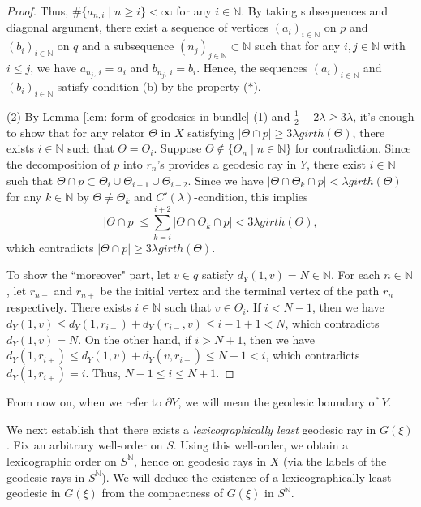 \documentclass{article}[11pt]
\newcommand{\N}{\mathbb{N}}
\begin{document}
{\begin{proof}
{    Thus, $\#\{a_{n,i} \mid n \ge i \} < \infty$ for any $i \in \N$. By taking subsequences and diagonal argument, there exist a sequence of vertices $(a_i)_{i \in \N}$ on $p$ and $(b_i)_{i \in \N}$ on $q$ and a subsequence $(n_j)_{j \in \N} \subset \N$ such that for any $i,j \in \N$ with $i \le j$, we have $a_{n_j,\,i} = a_i$ and $b_{n_j,\,i} = b_i$. Hence, the sequences $(a_i)_{i \in \N}$ and $(b_i)_{i \in \N}$ satisfy condition (b) by the property ($\ast$).

    (2)
    By Lemma \ref{lem: form of geodesics in bundle} (1) and $\frac12 - 2\lambda\ge 3\lambda$, it's enough to show that for any relator $\Theta$ in $X$ satisfying $|\Theta \cap p| \ge 3 \lambda girth(\Theta)$, there exists $i \in \N$ such that $\Theta = \Theta_i$. Suppose $\Theta \notin \{\Theta_n \mid n \in \N\}$ for contradiction. Since the decomposition of $p$ into $r_n$'s provides a geodesic ray in $Y$, there exist $i \in \N$ such that $\Theta \cap p \subset \Theta_i\cup\Theta_{i+1}\cup\Theta_{i+2}$. Since we have $|\Theta \cap\Theta_k \cap p| < \lambda girth(\Theta)$ for any $k\in \N$ by $\Theta \neq\Theta_k$ and $C'(\lambda)$-condition, this implies 
    $$|\Theta \cap p| \le \sum_{k=i}^{i+2}|\Theta \cap\Theta_k \cap p| < 3\lambda girth(\Theta),$$
    which contradicts $|\Theta \cap p| \ge 3 \lambda girth(\Theta)$.

    To show the ``moreover" part, let $v \in q$ satisfy $d_Y(1,v) = N \in \N$. For each $n \in \N$, let $r_{n-}$ and $r_{n+}$ be the initial vertex and the terminal vertex of the path $r_n$ respectively. There exists $i \in \N$ such that $v \in \Theta_i$. If $i < N-1$, then we have $d_Y(1,v) \le d_Y(1,r_{i-}) + d_Y(r_{i-},v)\le i-1+1<N$, which contradicts $d_Y(1,v)=N$. On the other hand, if $i>N+1$, then we have $d_Y(1,r_{i+}) \le d_Y(1,v) + d_Y(v,r_{i+})\le N+1<i$, which contradicts $d_Y(1,r_{i+}) = i$. Thus, $N-1 \le i \le N+1$.
    }
\end{proof}


From now on, when we refer to $\partial Y$, we will mean the geodesic boundary of $Y$. 



We next establish that there exists a \emph{lexicographically least} geodesic ray in $G(\xi)$. Fix an arbitrary well-order on $S$. Using this well-order, we obtain a lexicographic order on $S^{\N}$, hence on geodesic rays in $X$ (via the labels of the geodesic rays in $S^{\N}$). We will deduce the existence of a lexicographically least geodesic in $G(\xi)$ from the compactness of $G(\xi)$ in $S^{\N}$. %

}
\end{document}
